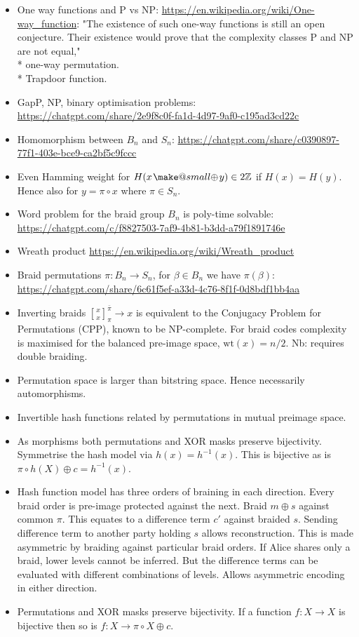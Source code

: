 \documentclass[twocolumn, aps, amsmath, amssymb, nofootinbib, superscriptaddress, longbibliography, doublefloatfix, table-of-contents, eqsecnum, rmp]{revtex4-2}
\makeatletter
\newcommand{\stackbraid}[2]{{\genfrac{[}{]}{0pt}{}{{#1}}{{#2}}}^{\bar{\pi}}_{\pi}}
\newcommand{\soplus}{{{\hspace{1pt}}{\mathbin{\mathpalette\make@small{\mathbin\oplus}}}}{\hspace{1pt}}}
\newcommand{\make@small}[2]{%
  \vcenter{\hbox{%
    \scalebox{0.6}{$\m@th#1#2$}%
  }}%
}
\makeatother
\begin{document}
\begin{itemize}
	\item One way functions and P vs NP: \url{https://en.wikipedia.org/wiki/One-way_function}: "The existence of such one-way functions is still an open conjecture. Their existence would prove that the complexity classes P and NP are not equal,"\\
		* one-way permutation.\\
		* Trapdoor function.\\
	\item GapP, NP, binary optimisation problems: \url{https://chatgpt.com/share/2e9f8c0f-fa1d-4d97-9af0-c195ad3cd22c}
	\item Homomorphism between $B_n$ and $S_n$: \url{https://chatgpt.com/share/c0390897-77f1-403e-bce9-ca2bf5c9fccc}
	\item Even Hamming weight for $H(x\soplus y)\in 2\mathbb{Z}$ if $H(x)=H(y)$. Hence also for $y=\pi\circ x$ where $\pi\in S_n$.
	\item Word problem for the braid group $B_n$ is poly-time solvable: \url{https://chatgpt.com/c/f8827503-7af9-4b81-b3dd-a79f1891746e}
	\item Wreath product \url{https://en.wikipedia.org/wiki/Wreath_product}
	\item Braid permutations \mbox{$\pi: B_n \to S_n$}, for $\beta\in B_n$ we have $\pi(\beta)$: \url{https://chatgpt.com/share/6c61f5ef-a33d-4c76-8f1f-0d8bdf1bb4aa}
	\item Inverting braids $\stackbraid{x}{x}\to x$ is equivalent to the Conjugacy Problem for Permutations (CPP), known to be NP-complete. For braid codes complexity is maximised for the balanced pre-image space, $\mathrm{wt}(x)=n/2$. Nb: requires double braiding.
	\item Permutation space is larger than bitstring space. Hence necessarily automorphisms.
	\item Invertible hash functions related by permutations in mutual preimage space.
	\item As morphisms both permutations and XOR masks preserve bijectivity. Symmetrise the hash model via $h(x)=h^{-1}(x)$. This is bijective as is $\pi\circ h(X)\oplus c=h^{-1}(x)$.
	\item Hash function model has three orders of braining in each direction. Every braid order is pre-image protected against the next. Braid $m\oplus s$ against common $\pi$. This equates to a difference term $c'$ against braided $s$. Sending difference term to another party holding $s$ allows reconstruction. This is made asymmetric by braiding against particular braid orders. If Alice shares only a braid, lower levels cannot be inferred. But the difference terms can be evaluated with different combinations of levels. Allows asymmetric encoding in either direction.
	\item Permutations and XOR masks preserve bijectivity. If a function $f: X\to X$ is bijective then so is $f: X\to \pi\circ X \oplus c$.
\end{itemize}
\end{document}

